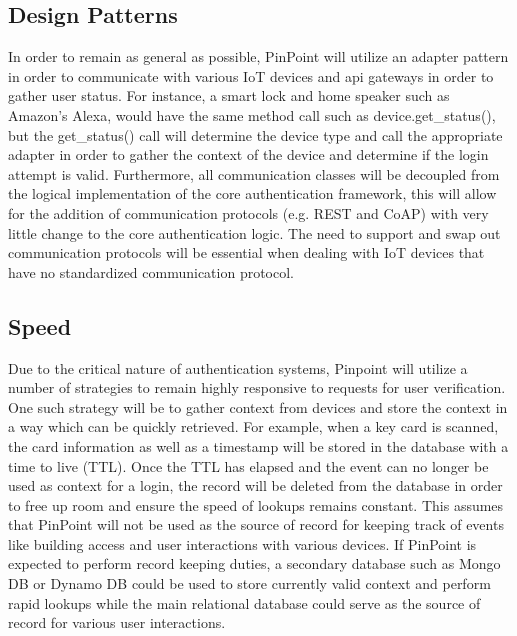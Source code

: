 \documentclass[11pt,journal]{IEEEtran}
\begin{document}
\subsection{Design Patterns}
In order to remain as general as possible, PinPoint will utilize an adapter pattern in order to communicate with various IoT devices and api gateways in order to gather user status.  For instance, a smart lock and home speaker such as Amazon’s Alexa, would have the same method call such as device.get\_status(), but the get\_status() call will determine the device type and call the appropriate adapter in order to gather the context of the device and determine if the login attempt is valid.  Furthermore, all communication classes will be decoupled from the logical implementation of the core authentication framework, this will allow for the addition of communication protocols (e.g. REST and CoAP) with very little change to the core authentication logic.  The need to support and swap out communication protocols will be essential when dealing with IoT devices that have no standardized communication protocol.

\subsection{Speed}
Due to the critical nature of authentication systems, Pinpoint will utilize a number of strategies to remain highly responsive to requests for user verification.  One such strategy will be to gather context from devices and store the context in a way which can be quickly retrieved.  For example, when a key card is scanned, the card information as well as a timestamp will be stored in the database with a time to live (TTL).  Once the TTL has elapsed and the event can no longer be used as context for a login, the record will be deleted from the database in order to free up room and ensure the speed of lookups remains constant.  This assumes that PinPoint will not be used as the source of record for keeping track of events like building access and user interactions with various devices.  If PinPoint is expected to perform record keeping duties, a secondary database such as Mongo DB or Dynamo DB could be used to store currently valid context and perform rapid lookups while the main relational database could serve as the source of record for various user interactions.
\end{document}
